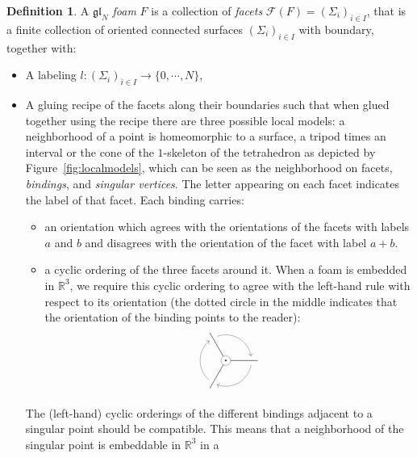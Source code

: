\documentclass[12pt]{amsart}
\theoremstyle{definition}
\newtheorem{definition}[theorem]{Definition}
\theoremstyle{remark}
\numberwithin{equation}{section}
\numberwithin{figure}{section}
\newcommand{\GL}{\mathfrak{gl}}
\begin{document}
\begin{definition}
  A \emph{$\GL_N$ foam} $F$ is a collection of \emph{facets} $\mathcal{F}(F)=(\Sigma_i)_{i\in I}$, that is a finite collection of oriented connected surfaces $(\Sigma_i)_{i\in I}$ with boundary, together with:
  \begin{itemize}
    \item A labeling $l:(\Sigma_i)_{i\in I}\to\{0,\cdots,N\}$,
    \item A gluing recipe of the facets along their boundaries such that when glued together using the recipe there are three possible local models: a neighborhood of a point is homeomorphic to a surface, a tripod times an interval or the cone of the $1$-skeleton of the tetrahedron as depicted by Figure~\ref{fig:localmodels}, which can be seen as the neighborhood on facets, \emph{bindings}, and \emph{singular vertices}. The letter appearing on each facet indicates the label of that facet. Each binding carries:
    \begin{itemize}
    \item an orientation which agrees with the orientations of the facets with
      labels $a$ and $b$ and disagrees with the orientation of the facet with label
      $a+b$.
    \item a cyclic ordering of the three facets around it. When a foam
      is embedded in $\mathbb{R}^3$, we require this cyclic ordering to agree with 
      the left-hand rule with respect to its
      orientation (the dotted circle in the middle indicates that the
      orientation of the binding points to the reader):
      \[
        \begin{tikzpicture}[xscale=1]
          \begin{scope}
            \draw (0,0) -- +(0:1);
            \draw (0,0) -- +(120:1);
            \draw (0,0) -- +(240:1);
            \filldraw[fill= white, draw=black, very thin] (0,0) circle (0.15cm);
            \filldraw[fill = black] (0,0) circle (0.02cm);
            \draw[very thin,->] (-10:0.8cm) arc (-10:-110 :0.8); 
            \draw[very thin,->] (230:0.8cm) arc (230: 130:0.8); 
            \draw[very thin,->] (110:0.8cm) arc (110:10 :0.8); 
           \end{scope}
        \end{tikzpicture}
      \]
    \end{itemize}
    The (left-hand) cyclic orderings of the different bindings adjacent to a
    singular point should be compatible. This means that a
    neighborhood of the singular point is embeddable in $\mathbb{R}^3$ in a

\end{itemize}
\end{definition}
\end{document}
